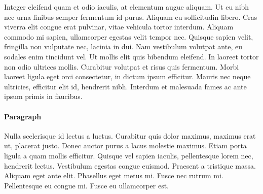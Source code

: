 \documentclass[10pt,sigconf,anonymous]{acmart}
\begin{document}
Integer eleifend quam et odio iaculis, at elementum augue aliquam.
Ut eu nibh nec urna finibus semper fermentum id purus.
Aliquam eu sollicitudin libero.
Cras viverra elit congue erat pulvinar, vitae vehicula tortor interdum.
Aliquam commodo mi sapien, ullamcorper egestas velit tempor nec.
Quisque sapien velit, fringilla non vulputate nec, lacinia in dui.
Nam vestibulum volutpat ante, eu sodales enim tincidunt vel.
Ut mollis elit quis bibendum eleifend.
In laoreet tortor non odio ultrices mollis.
Curabitur volutpat et risus quis fermentum.
Morbi laoreet ligula eget orci consectetur, in dictum ipsum efficitur.
Mauris nec neque ultricies, efficitur elit id, hendrerit nibh.
Interdum et malesuada fames ac ante ipsum primis in faucibus.



\paragraph{Paragraph}

Nulla scelerisque id lectus a luctus.
Curabitur quis dolor maximus, maximus erat ut, placerat justo.
Donec auctor purus a lacus molestie maximus.
Etiam porta ligula a quam mollis efficitur.
Quisque vel sapien iaculis, pellentesque lorem nec, hendrerit lectus.
Vestibulum egestas congue euismod.
Praesent a tristique massa.
Aliquam eget ante elit.
Phasellus eget metus mi.
Fusce nec rutrum mi.
Pellentesque eu congue mi.
Fusce eu ullamcorper est.



 
\end{document}
